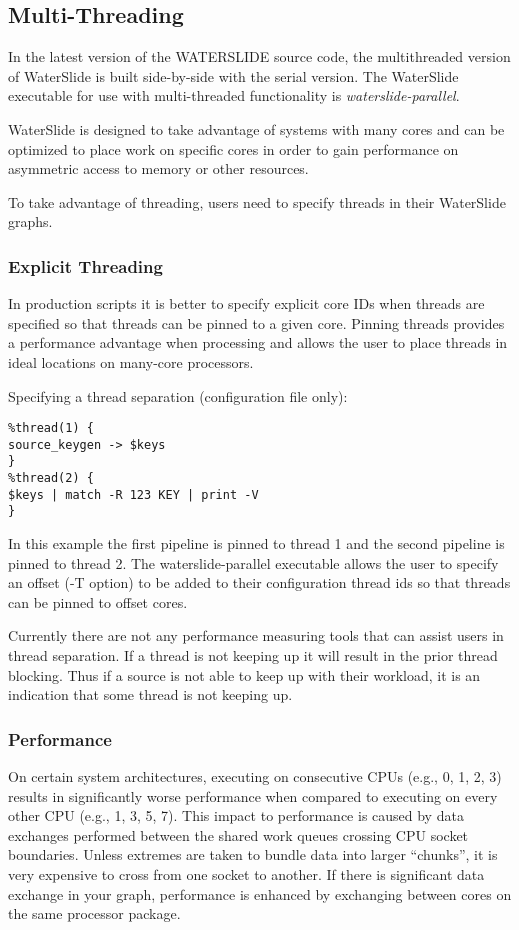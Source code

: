 \documentclass[11pt]{article}
\begin{document}
\subsection{Multi-Threading}
In the latest version of the WATERSLIDE source code, the multithreaded version of WaterSlide is built side-by-side with the serial version.  The
WaterSlide executable for use with multi-threaded functionality is \emph{waterslide-parallel}.

WaterSlide is designed to take advantage of systems with many cores and can be optimized to place work
on specific cores in order to gain performance on asymmetric access to memory or other resources.

To take advantage of threading, users need to specify threads in their WaterSlide graphs.

\subsubsection{Explicit Threading}
In production scripts it is better to specify explicit core IDs when threads are specified so that
threads can be pinned to a given core.  Pinning threads provides a performance advantage when
processing and allows the user to place threads in ideal locations on many-core processors.

Specifying a thread separation (configuration file only):
\begin{lstlisting}
%thread(1) {
source_keygen -> $keys
}
%thread(2) {
$keys | match -R 123 KEY | print -V
}
\end{lstlisting}

In this example the first pipeline is pinned to thread 1 and the second pipeline is pinned to thread
2.  The waterslide-parallel executable allows the user to specify an offset (-T option) to be added to their
configuration thread ids so that threads can be pinned to offset cores.

Currently there are not any performance measuring tools that can assist users in thread separation.
If a thread is not keeping up it will result in the prior thread blocking.  Thus if a source is not
able to keep up with their workload, it is an indication that some thread is not keeping up.

\subsubsection{Performance}
On certain system architectures, executing on consecutive CPUs (e.g., 0, 1, 2, 3) results in
significantly worse performance when compared to executing on every other CPU (e.g., 1, 3, 5, 7).
This impact to performance is caused by data exchanges performed between the shared work queues
crossing CPU socket boundaries. Unless extremes are taken to bundle data into larger ``chunks'', it is very expensive to cross from one socket
to another. If there is significant data exchange in your graph, performance is enhanced by
exchanging between cores on the same processor package.
\end{document}
